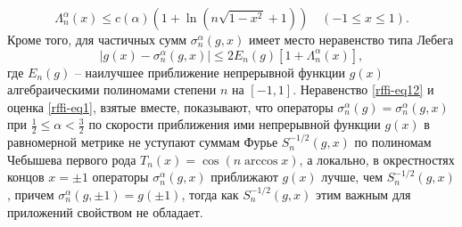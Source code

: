 \begin{equation}\label{rffi-eq1}
\Lambda_n^\alpha(x)\le c(\alpha)(1+\ln(n\sqrt{1-x^2}+1))\quad(-1\le x\le1).
\end{equation}
Кроме того, для частичных сумм $\sigma_n^\alpha(g,x)$ имеет место неравенство типа Лебега
\begin{equation}\label{rffi-eq12}
|g(x)-\sigma_n^\alpha(g,x)|\le 2E_n(g)[1+\Lambda_n^\alpha(x)],
\end{equation}
где $E_n(g)$ -- наилучшее приближение непрерывной функции $g(x)$ алгебраическими полиномами степени $n$ на $[-1,1]$. Неравенство \eqref{rffi-eq12} и оценка \eqref{rffi-eq1}, взятые вместе, показывают, что операторы  $\sigma_n^\alpha(g)=\sigma_n^\alpha(g,x)$ при $\frac12\le \alpha< \frac32$ по скорости приближения ими непрерывной функции $g(x)$ в равномерной метрике не уступают суммам Фурье $S_n^{-1/2}(g,x)$ по полиномам Чебышева первого рода  $T_n(x)=\cos(n\arccos x)$, а локально, в окрестностях концов $x=\pm1$ операторы $\sigma_n^\alpha(g,x)$ приближают $g(x)$ лучше, чем $S_n^{-1/2}(g,x)$, причем $\sigma_n^\alpha(g,\pm1)=g(\pm1)$, тогда как $S_n^{-1/2}(g,x)$ этим важным для приложений свойством не обладает.

